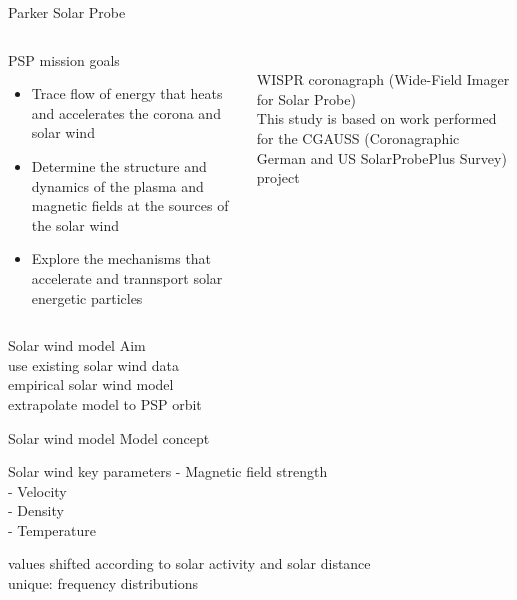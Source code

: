 \begin{frame}[plain,c]{Parker Solar Probe}{}
	\begin{columns}[c]
	\column{\textwidth}
		
		\begin{block}{PSP mission goals \citep{Fox2015}}
			\begin{itemize}
				\item Trace flow of energy that heats and accelerates the corona and solar wind
				\item Determine the structure and dynamics of the plasma and magnetic fields at the sources of the solar wind
				\item Explore the mechanisms that accelerate and trannsport solar energetic particles
			\end{itemize}
		\end{block}
		\ \\
		WISPR coronagraph (Wide-Field Imager for Solar Probe)\\
		This study is based on work performed for the CGAUSS (Coronagraphic German and US SolarProbePlus Survey) project

	\end{columns}
\end{frame}

\begin{frame}[plain,c]{Solar wind model}{}
	Aim\\
	use existing solar wind data\\
	empirical solar wind model\\
	extrapolate model to PSP orbit
\end{frame}

\begin{frame}[plain,c]{Solar wind model}{}
	Model concept\\
	\begin{block}{Solar wind key parameters}
		- Magnetic field strength\\
		- Velocity\\
		- Density\\
		- Temperature
	\end{block}
	
	values shifted according to solar activity and solar distance\\
	unique: frequency distributions
\end{frame}

